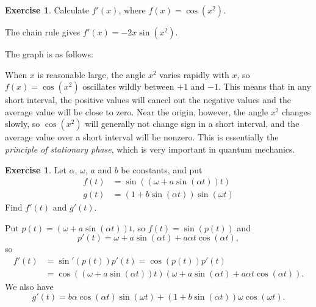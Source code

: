 \documentclass[a4paper]{book}
\newcommand{\PURPLE}[1]{{\color{purple}#1}}
\newcommand{\al}        {\alpha}
\newcommand{\om}        {\omega}
\renewcommand{\:}{\colon}
\newcommand{\DEFN}[1]{\PURPLE{\emph{#1}}}
\theoremstyle{definition}
\newtheorem{exercise}[theorem]{Exercise}
\renewenvironment{solution}{\SolutionInline}{\endSolutionInline}
\begin{document}
\begin{exercise}
 Calculate $f'(x)$, where $f(x)=\cos(x^2)$.
\end{exercise}
\begin{solution}
 The chain rule gives $f'(x)=-2x\sin(x^2)$. 
\end{solution}
\begin{background}
 The graph is as follows:
 \begin{center}
 \end{center}
 When $x$ is reasonable large, the angle $x^2$ varies rapidly with $x$,
 so $f(x)=\cos(x^2)$ oscillates wildly between $+1$ and $-1$.  This
 means that in any short interval, the positive values will cancel out
 the negative values and the average value will be close to zero.  Near
 the origin, however, the angle $x^2$ changes slowly, so $\cos(x^2)$
 will generally not change sign in a short interval, and the average
 value over a short interval will be nonzero.  This is essentially the
 \DEFN{principle of stationary phase}, which is very important in
 quantum mechanics.
\end{background}
\begin{exercise}
 Let $\al$, $\om$, $a$ and $b$ be constants, and put
 \begin{align*}
  f(t) &= \sin((\om+a\sin(\al t))t) \\
  g(t) &= (1+b\sin(\al t))\sin(\om t)
 \end{align*}
 Find $f'(t)$ and $g'(t)$.
\end{exercise}
\begin{solution}
 Put $p(t)=(\om+a\sin(\al t))t$, so $f(t)=\sin(p(t))$ and 
 \[ p'(t) = \om + a\sin(\al t) + a\al t\cos(\al t), \] 
 so
 \begin{align*}
  f'(t) &= \sin'(p(t)) p'(t) = \cos(p(t)) p'(t) \\
        &= \cos((\om+a\sin(\al t))t)
            (\om + a\sin(\al t) + a\al t\cos(\al t)).
 \end{align*}
 We also have
 \[ g'(t) = b\al\cos(\al t)\sin(\om t) + 
            (1+b\sin(\al t))\om \cos(\om t). 
 \]
\end{solution}
\end{document}
